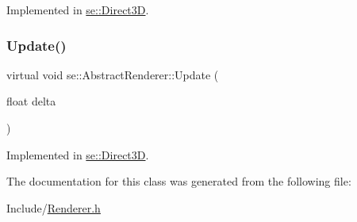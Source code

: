Implemented in \mbox{\hyperlink{classse_1_1_direct3_d_af4e167f88160d79fc66b4d65694b536a}{se\+::\+Direct3D}}.

\mbox{\label{classse_1_1_abstract_renderer_aae49e7417663d6a5aca34a2bb37b4b28}} 
\subsubsection{\texorpdfstring{Update()}{Update()}}
{\footnotesize\ttfamily virtual void se\+::\+Abstract\+Renderer\+::\+Update (\begin{DoxyParamCaption}\item[{float}]{delta }\end{DoxyParamCaption})\hspace{0.3cm}{\ttfamily [pure virtual]}}



Implemented in \mbox{\hyperlink{classse_1_1_direct3_d_a39934c194406f108a992d82a4d265381}{se\+::\+Direct3D}}.



The documentation for this class was generated from the following file\+:\begin{DoxyCompactItemize}
\item 
Include/\mbox{\hyperlink{_renderer_8h}{Renderer.\+h}}\end{DoxyCompactItemize}
